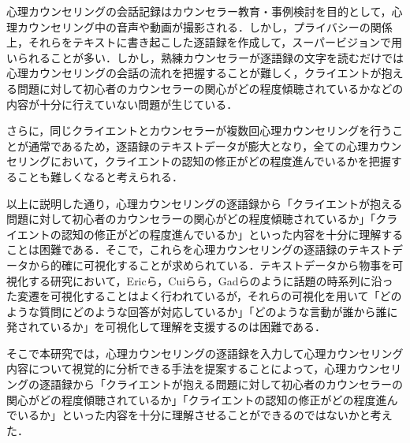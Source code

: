 \documentclass[shuuron]{kuee}
\begin{document}
心理カウンセリングの会話記録はカウンセラー教育・事例検討を目的として，心理カウンセリング中の音声や動画が撮影される．しかし，プライバシーの関係上，それらをテキストに書き起こした逐語録を作成して，スーパービジョンで用いられることが多い．しかし，熟練カウンセラーが逐語録の文字を読むだけでは心理カウンセリングの会話の流れを把握することが難しく，クライエントが抱える問題に対して初心者のカウンセラーの関心がどの程度傾聴されているかなどの内容が十分に行えていない問題が生じている．


さらに，同じクライエントとカウンセラーが複数回心理カウンセリングを行うことが通常であるため，逐語録のテキストデータが膨大となり，全ての心理カウンセリングにおいて，クライエントの認知の修正がどの程度進んでいるかを把握することも難しくなると考えられる．%


以上に説明した通り，心理カウンセリングの逐語録から「クライエントが抱える問題に対して初心者のカウンセラーの関心がどの程度傾聴されているか」「クライエントの認知の修正がどの程度進んでいるか」といった内容を十分に理解することは困難である．そこで，これらを心理カウンセリングの逐語録のテキストデータから的確に可視化することが求められている．テキストデータから物事を可視化する研究において，Ericら\cite{taskdriven}，Cuiら\cite{cui2011textflow}ら，Gadら\cite{gad2015themedelta}のように話題の時系列に沿った変遷を可視化することはよく行われているが，それらの可視化を用いて「どのような質問にどのような回答が対応しているか」「どのような言動が誰から誰に発されているか」を可視化して理解を支援するのは困難である．

そこで本研究では，心理カウンセリングの逐語録を入力して心理カウンセリング内容について視覚的に分析できる手法を提案することによって，心理カウンセリングの逐語録から「クライエントが抱える問題に対して初心者のカウンセラーの関心がどの程度傾聴されているか」「クライエントの認知の修正がどの程度進んでいるか」といった内容を十分に理解させることができるのではないかと考えた．
\end{document}
